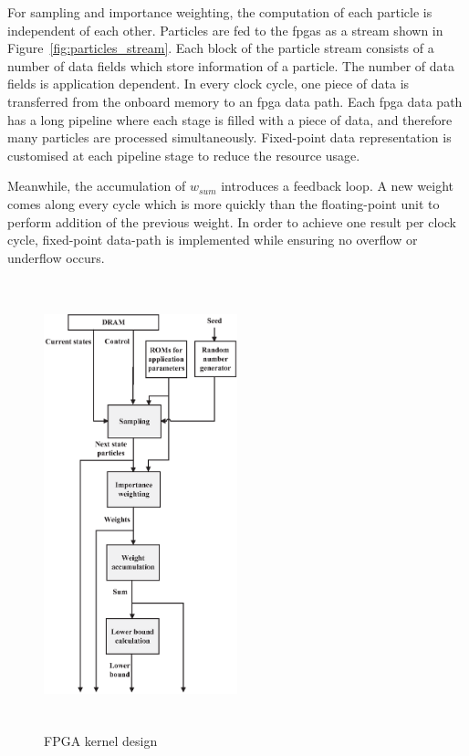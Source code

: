 For sampling and importance weighting, the computation of each particle is independent of each other.
Particles are fed to the \gls{fpga}s as a stream shown in Figure~\ref{fig:particles_stream}.
Each block of the particle stream consists of a number of data fields which store information of a particle.
The number of data fields is application dependent.
In every clock cycle, one piece of data is transferred from the onboard memory to an \gls{fpga} data path.
Each \gls{fpga} data path has a long pipeline where each stage is filled with a piece of data, and therefore many particles are processed simultaneously.
Fixed-point data representation is customised at each pipeline stage to reduce the resource usage.

Meanwhile, the accumulation of $w_{sum}$ introduces a feedback loop.
A new weight comes along every cycle which is more quickly than the floating-point unit to perform addition of the previous weight.
In order to achieve one result per clock cycle, fixed-point data-path is implemented while ensuring no overflow or underflow occurs.

\begin{figure}[t!]
\centering
\includegraphics[width=0.5\textwidth,height=130mm]{4_adaptation/figures/fig_kernel}
\caption{FPGA kernel design}
\label{fig:reconfig_kernel}
\end{figure}

